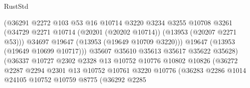 \begin{lexlean}{RustStd}
\begin{coremodule}
                                        (@36291
                                          @2272
                                          @103
                                          @53
                                          @16
                                          @10714
                                          @3220
                                          @3234
                                          @3255
                                          @10708
                                          @3261
                                          (@34729
                                            @2271
                                            @10714
                                            (@20201 (@20202 @10714))
                                            (@13953 (@20207 @2271 @53)))
                                          @34697
                                          @19647
                                          (@13953 (@19649 @10709 @3220)))
                                        @19647
                                        (@13953 (@19649 @10699 @10717)))
                                      @35607
                                      @35610
                                      @35613
                                      @35617
                                      @35622
                                      @35628)
                                    (@36337
                                      @10727
                                      @2302
                                      @2328
                                      @13
                                      @10752
                                      @10776
                                      @10802
                                      @10826
                                      (@36272
                                        @2287
                                        @2294
                                        @2301
                                        @13
                                        @10752
                                        @10761
                                        @3220
                                        @10776
                                        (@36283
                                          @2286
                                          @1014
                                          @24105
                                          @10752
                                          @10759
                                          @8775
                                          (@36292
                                            @2285

\end{coremodule}
\end{lexlean}
